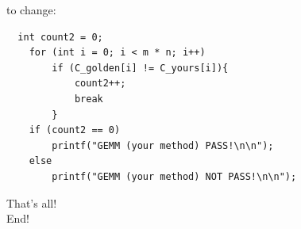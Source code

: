 \documentclass[12pt]{article}
\begin{document}
to change:
\begin{lstlisting}
  int count2 = 0;
    for (int i = 0; i < m * n; i++)
        if (C_golden[i] != C_yours[i]){
            count2++;
            break
        }
    if (count2 == 0)
        printf("GEMM (your method) PASS!\n\n");
    else
        printf("GEMM (your method) NOT PASS!\n\n");
\end{lstlisting}
\begin{center}
\Huge{That's all!} \\
\Huge{End!} \\
\end{center} 
\end{document}
